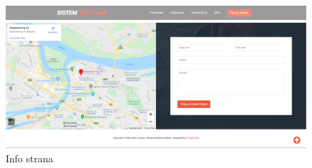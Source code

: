 \documentclass[../main.tex]{subfiles}
\begin{document}
\begin{figure}[!ht]
\begin{center}
\includegraphics[scale=0.35]{sections/korisnicki_interfejs/screenshots/info_strana.PNG}
\end{center}
\caption{Info strana}
\label{fig:info}
\end{figure}
\end{document}
